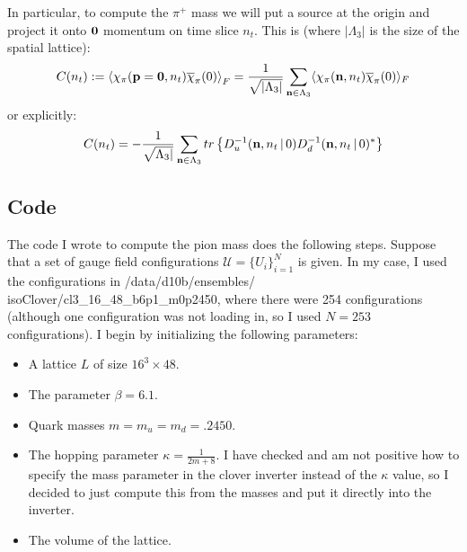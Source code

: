 \documentclass[11pt, oneside]{article}   	%
\theoremstyle{definition}
\begin{document}
In particular, to compute the $\pi^+$ mass we will put a source at the origin and project it onto $\textbf 0$ momentum 
on time slice $n_t$. This is (where $|\Lambda_3|$ is the size of the spatial lattice):
\begin{equation}
	C(n_t) := \left\langle \chi_\pi(\textbf p = \textbf 0, n_t)\overline\chi_\pi (0)\right\rangle_F = \frac{1}{\sqrt{
	|\Lambda_3|}}\sum_{\mathbf n\in\Lambda_3}\langle \chi_\pi(\textbf n, n_t)\overline\chi_\pi(0)\rangle_F
\end{equation}
or explicitly:
\begin{equation}
	C(n_t) = -\frac{1}{\sqrt{\Lambda_3|}}\sum_{\textbf n\in\Lambda_3} tr\left\{ D^{-1}_u (\textbf n, n_t \,|\, 0) D^{-1}_d 
	(\textbf n, n_t \,|\,0)^*\right\}
\end{equation}

\newpage
\subsection{Code}

The code I wrote to compute the pion mass does the following steps. Suppose that a set of gauge field 
configurations $\mathcal U = \{U_i\}_{i = 1}^N$ is given. In my case, I used the configurations in 
/data/d10b/ensembles/ isoClover/cl3\_16\_48\_b6p1\_m0p2450, where there were 254 configurations (although one 
configuration was not loading in, so I used $N = 253$ configurations). I begin by initializing the following parameters:
\begin{itemize}
	\item A lattice $L$ of size $16^3\times 48$. 
	\item The parameter $\beta = 6.1$.
	\item Quark masses $m = m_u = m_d = .2450$.
	\item The hopping parameter $\kappa = \frac{1}{2m + 8}$. I have checked and am not positive how to specify the 
	mass parameter in the clover inverter instead of the $\kappa$ value, so I decided to just compute this from the 
	masses and put it directly into the inverter. 
	\item The volume of the lattice.
\end{itemize}
\end{document}
